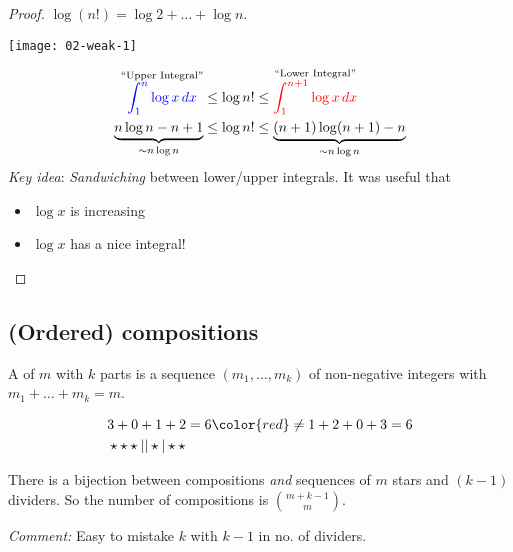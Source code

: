\begin{proof}
    $\log(n!) = \log 2 + \dots + \log n$.
    {\par \centering \texttt{[image: 02-weak-1]} \par}
    \begin{align*}
        \overset{``\text{Upper Integral}"}{\mathcolor{blue}{\int_{1}^{n} \log x \,dx}} \leq \log n! &\leq \overset{``\text{Lower Integral}"}{\mathcolor{red}{\int_{1}^{n + 1} \log x \,dx}} \\
        \underbrace{n \log n - n + 1}_{\sim n \log n} \leq \log n! &\leq \underbrace{(n + 1)\log(n+1) - n}_{\sim n \log n}
    \end{align*} 
    \emph{Key idea}: \emph{Sandwiching} between lower/upper integrals. It was useful that
    \begin{itemize}
        \item $\log x$ is increasing
        \item $\log x$ has a nice integral!
    \end{itemize} 
\end{proof}

\subsection{(Ordered) compositions}

\begin{definition}[Composition]
    A  of $m$ with $k$ parts is a sequence $(m_1, \dots, m_k)$ of non-negative integers with $m_1 + \dots + m_k = m$.
\end{definition} 
\begin{example}
    \begin{align*}
        &3 + 0 + 1 + 2 = 6 \color{red} \neq 1 + 2 + 0 + 3 = 6 \\
        &\star \star \star | | \star | \star \star
    \end{align*} 
\end{example} 

There is a bijection between compositions \emph{and} sequences of $m$ stars and $(k - 1)$ dividers.
So the number of compositions is $\binom{m + k -1}{m}$.

\emph{Comment:} Easy to mistake $k$ with $k - 1$ in no. of dividers.